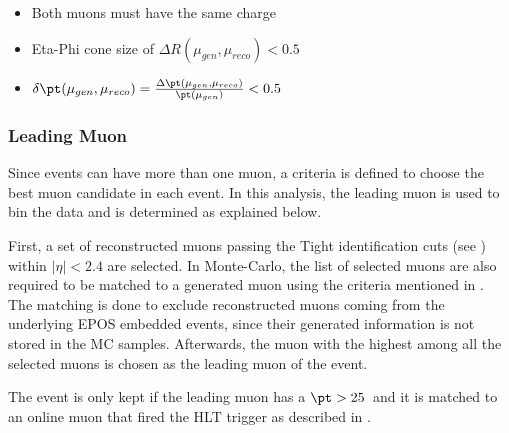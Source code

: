 \begin{itemize}
\item Both muons must have the same charge
\item Eta-Phi cone size of $\Delta{R}(\mu_{gen} , \mu_{reco}) < 0.5$
\item $\delta{\pt}(\mu_{gen} , \mu_{reco}) = \frac{\Delta{\pt}(\mu_{gen} , \mu_{reco})}{\pt(\mu_{gen})} < 0.5$
\end{itemize}


\subsubsection{Leading Muon} \label{sec:WBoson_Analysis_LeadingMuon}

Since events can have more than one muon, a criteria is defined to choose the best muon candidate in each event. In this analysis, the leading muon is used to bin the data and is determined as explained below.

First, a set of reconstructed muons passing the Tight identification cuts (see ) within $|\eta| < 2.4$ are selected. In Monte-Carlo, the list of selected muons are also required to be matched to a generated muon using the criteria mentioned in . The matching is done to exclude reconstructed muons coming from the underlying EPOS embedded events, since their generated information is not stored in the MC samples. Afterwards, the muon with the highest \pt among all the selected muons is chosen as the leading muon of the event.

The event is only kept if the leading muon has a $\pt > 25$~\GeVc and it is matched to an online muon that fired the HLT trigger as described in .



\clearpage

